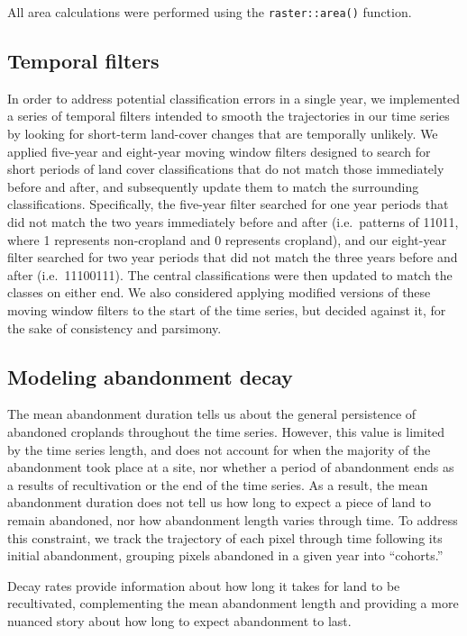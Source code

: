 \documentclass[9pt,twoside,lineno]{pnas-new}
\begin{document}
All area calculations were performed using the \texttt{raster::area()} function.

\hypertarget{temporal-filters}{%
\subsection{Temporal filters}\label{temporal-filters}}

In order to address potential classification errors in a single year, we implemented a series of temporal filters intended to smooth the trajectories in our time series by looking for short-term land-cover changes that are temporally unlikely.
We applied five-year and eight-year moving window filters designed to search for short periods of land cover classifications that do not match those immediately before and after, and subsequently update them to match the surrounding classifications.
Specifically, the five-year filter searched for one year periods that did not match the two years immediately before and after (i.e.~patterns of 11011, where 1 represents non-cropland and 0 represents cropland), and our eight-year filter searched for two year periods that did not match the three years before and after (i.e.~11100111).
The central classifications were then updated to match the classes on either end.
We also considered applying modified versions of these moving window filters to the start of the time series, but decided against it, for the sake of consistency and parsimony.

\hypertarget{decay-models-si}{%
\subsection{Modeling abandonment decay}\label{decay-models-si}}

The mean abandonment duration tells us about the general persistence of abandoned croplands throughout the time series.
However, this value is limited by the time series length, and does not account for when the majority of the abandonment took place at a site, nor whether a period of abandonment ends as a results of recultivation or the end of the time series.
As a result, the mean abandonment duration does not tell us how long to expect a piece of land to remain abandoned, nor how abandonment length varies through time.
To address this constraint, we track the trajectory of each pixel through time following its initial abandonment, grouping pixels abandoned in a given year into ``cohorts.''

Decay rates provide information about how long it takes for land to be recultivated, complementing the mean abandonment length and providing a more nuanced story about how long to expect abandonment to last.
\end{document}

